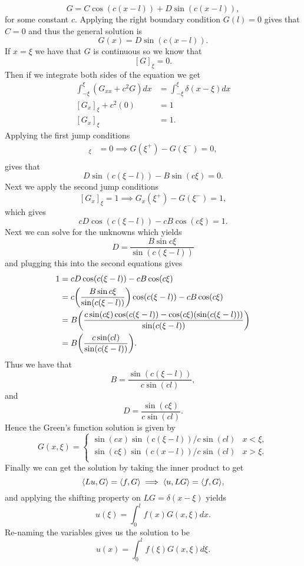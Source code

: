 \documentclass[12pt]{report}
\begin{document}
\begin{solution}
\begin{enumerate}
        \[ 
            G = C \cos(c(x - l)) + D \sin(c(x - l)),
        \]
        for some constant $c$. Applying the right boundary condition $G(l) = 0$ gives that $C = 0$ and thus the general solution is
        \[ 
            G(x) = D\sin(c(x - l)).
        \]
        If $x = \xi$ we have that $G$ is continuous so we know that 
        \[ 
            [G]_\xi = 0.
        \] 
        Then if we integrate both sides of the equation we get
        \begin{align*}
            \int_{-\xi}^{\xi}(G_{xx} + c^2G)dx &= \int_{-\xi}^{\xi}\delta(x - \xi)dx\\
            [G_x]_\xi + c^2 (0)&= 1\\
            [G_x]_\xi &= 1. 
        \end{align*} 
        Applying the first jump conditions
        \begin{align*}
            [G]_\xi &= 0 \implies G(\xi^+) - G(\xi^-) = 0,\\
        \end{align*}
        gives that
        \[ 
            D\sin(c(\xi - l)) - B\sin(c\xi) = 0.
        \]
        Next we apply the second jump conditions
        \[ 
            [G_x]_\xi = 1 \implies G_x(\xi^+) - G(\xi^-) = 1,
        \]
        which gives 
        \[
            cD\cos(c(\xi-l)) - cB\cos(c\xi) = 1.
        \]
        Next we can solve for the unknowns which yields
        \[
            D = \frac{B\sin{c \xi}}{\sin(c(\xi-l))}
        \]
        and plugging this into the second equations gives
        \begin{align*}
            1 &= cD\cos(c(\xi-l)) - cB\cos(c\xi)\\
            &= c{\left(\frac{B\sin{c \xi}}{\sin(c(\xi-l))}\right)}\cos(c(\xi-l)) - cB\cos(c\xi)\\
            &= B {\left( \frac{c\sin(c\xi)\cos(c(\xi-l)) - \cos(c\xi)(\sin(c(\xi - l)))}{\sin(c(\xi -l))}\right)}\\
            &= B {\left(\frac{c\sin(cl)}{\sin(c(\xi -l))}\right)}.
        \end{align*}
        Thus we have that
        \[ 
            B = \frac{\sin(c(\xi - l))}{c\sin(cl)},
        \]
        and
        \[ 
            D = \frac{\sin(c\xi)}{c\sin(cl)}.
        \]
        Hence the Green's function solution is given by
        \[ 
            G(x,\xi) = \begin{cases}
                \sin(cx)\sin(c(\xi - l)) / c\sin(cl) & x < \xi,\\
                \sin(c\xi)\sin(c(x - l)) / c\sin(cl) & x > \xi.\\
            \end{cases}
        \]
        Finally we can get the solution by taking the inner product to get
        \[ 
            {\left\langle Lu,G\right\rangle} = {\left\langle f,G\right\rangle} \implies {\left\langle u,LG\right\rangle} = {\left\langle f,G\right\rangle},
        \]
        and applying the shifting property on $LG = \delta(x - \xi)$ yields
        \[ 
            u(\xi) = \int_0^l f(x)G(x,\xi)dx.
        \]
        Re-naming the variables gives us the solution to be
        \[ 
            u(x) = \int_0^l f(\xi)G(x,\xi)d\xi.
        \]


\end{enumerate}
\end{solution}
\end{document}
